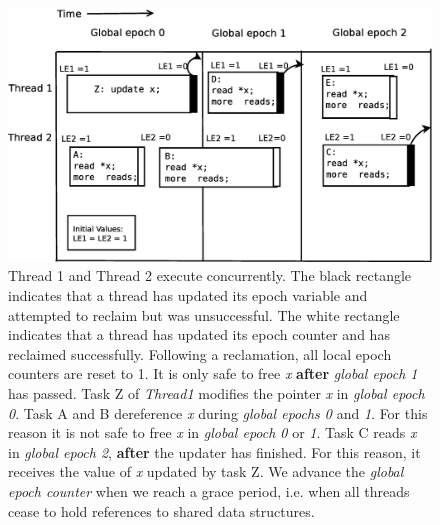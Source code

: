 \documentclass[a4paper,marginparwidth=50pt,marginparsep=10pt]{article}
\begin{document}
\begin{figure}[float=tph]
\begin{center}
\includegraphics[scale=0.36]{../images/diagrams/rcuexp2}
\caption{Thread 1 and Thread 2 execute concurrently. 
The black rectangle indicates that a thread has updated its epoch variable and attempted to reclaim but was unsuccessful. The white rectangle indicates that a thread has updated its epoch counter and has reclaimed successfully. Following a reclamation, all local epoch counters are reset to 1. 
It is only safe to free \emph{x}  \textbf{after} \emph{global epoch 1} has passed. Task Z of \emph{Thread1} modifies the pointer \emph{x} in \emph{global epoch 0}. Task A and B dereference \emph{x} during \emph{global epochs 0} and \emph{1}. For this reason it is not safe to free \emph{x} in \emph{global epoch 0} or \emph{1}. Task C reads \emph{x} in \emph{global epoch 2}, \textbf{after} the updater has finished. For this reason, it receives the value of \emph{x} updated by task Z. We advance the \emph{global epoch counter} when we reach a grace period, i.e. when all threads cease to hold references to shared data structures.}
\label{fig:rcuexp2}
\end{center}
\end{figure}
\end{document}
